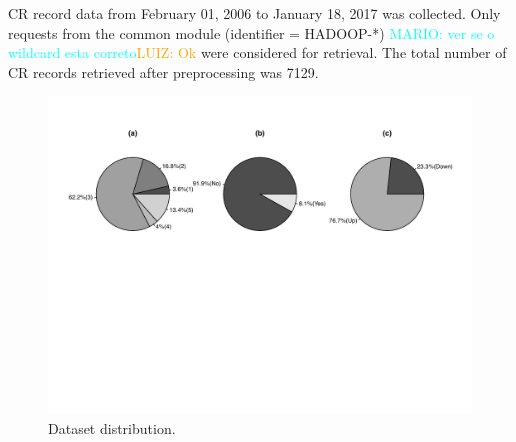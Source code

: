 \documentclass[10pt, conference]{IEEEtran}
\newcommand{\luiz}[1]{\noindent\textcolor{orange}{LUIZ: {#1}}}
\newcommand{\mario}[1]{\noindent\textcolor{cyan}{MARIO: {#1}}}
\newcommand{\luiz}[1]{}
\newcommand{\mario}[1]{}
\begin{document}
CR record data from February 01, 2006 to January 18, 2017 was collected.  Only requests from the common module (identifier = HADOOP-*) \mario{ver se o wildcard esta correto}\luiz{Ok} were considered for retrieval. The total number of CR records retrieved after preprocessing was 7129. 


\begin{figure}[hbt]
  \includegraphics{figures/ds_distribution.pdf}    %
  \caption{Dataset distribution.}
  \label{fig:ds_distribution}
\end{figure}


%
\end{document}
